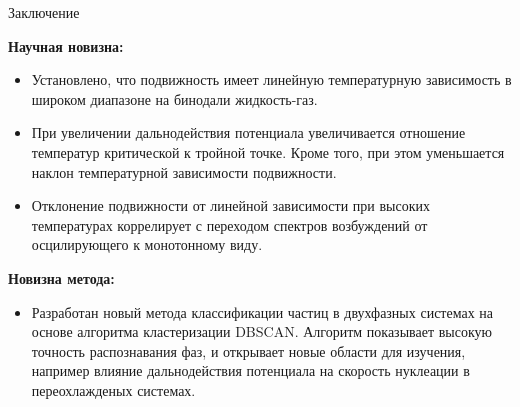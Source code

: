 \documentclass{beamer}
\begin{document}
\begin{frame}{Заключение}
\footnotesize{

\textbf{Научная новизна:}

\begin{itemize}

    \item Установлено, что подвижность имеет линейную температурную зависимость в широком диапазоне на бинодали жидкость-газ.

    \item При увеличении дальнодействия потенциала увеличивается отношение температур критической к тройной точке. Кроме того, при этом уменьшается наклон температурной зависимости подвижности.

    \item Отклонение подвижности от линейной зависимости при высоких температурах коррелирует с переходом спектров возбуждений от осцилирующего к монотонному виду.

\end{itemize}

\textbf{Новизна метода:}

\begin{itemize}

    \item Разработан новый метода классификации частиц в двухфазных системах на основе алгоритма кластеризации DBSCAN. Алгоритм показывает высокую точность распознавания фаз, и открывает новые области для изучения, например влияние дальнодействия потенциала на скорость нуклеации в переохлажденых системах.

\end{itemize}


}
\end{frame}
\end{document}

